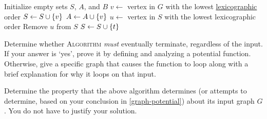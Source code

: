 \documentclass[11pt,addpoints,answers]{exam}
\begin{document}
\begin{questions}
    \begin{minipage}[t]{\linewidth}
    \begin{algorithm}[H]
      \begin{algorithmic}[1]
            \State Initialize empty sets $S$, $A$, and $B$
            \State $v \gets$ vertex in $G$ with the lowest \href{https://en.wikipedia.org/wiki/Lexicographic_order}{lexicographic} order
            \State $S \gets S \cup \{v\}$ 
            \State $A \gets A \cup \{v\}$  
                \State $u \gets $ vertex in $S$ with the lowest lexicographic order
                \State Remove $u$ from $S$
                        \State {}
                    \EndIf
                        \State $S \gets S \cup \{t\}$ 
                    \EndIf
                \EndFor
            \EndWhile
            \State {}
        \EndFunction
      \end{algorithmic}
    \end{algorithm}
  \end{minipage}

  \begin{parts}

  \bonuspart [3] Determine whether \textsc{Algorithm} \emph{must} eventually terminate, regardless of the input. If your answer is `yes', prove it by defining and analyzing a potential function. Otherwise, give a specific graph that causes the function to loop along with a brief explanation for why it loops on that input. \label{graph-potential}

   \begin{solution}

  \end{solution}

  \bonuspart [2] Determine the property that the above algorithm determines (or attempts to determine, based on your conclusion in \cref{graph-potential}) about its input graph $G$. You do not have to justify your solution. 

  \begin{solution}

  \end{solution}
  \end{parts}

\end{questions}
\end{document}

